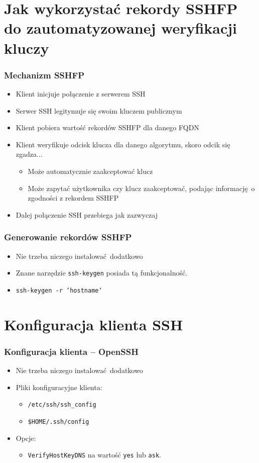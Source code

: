 \documentclass[dvipsnames,table]{beamer}
\begin{document}
\section{Jak wykorzystać rekordy SSHFP do zautomatyzowanej weryfikacji kluczy}

\begin{frame}
\frametitle{Mechanizm SSHFP}
\begin{itemize}
	\item Klient inicjuje połączenie z serwerem SSH
	\item Serwer SSH legitymuje się swoim kluczem publicznym
	\item Klient pobiera wartość rekordów SSHFP dla danego FQDN
	\item Klient weryfikuje odcisk klucza dla danego algorytmu, skoro odcik się zgadza...
	\begin{itemize}
		\item Może automatycznie zaakceptować klucz
		\item Może zapytać użytkownika czy klucz zaakceptować, podając informację o zgodności z rekordem SSHFP
	\end{itemize}
	\item Dalej połączenie SSH przebiega jak zazwyczaj
\end{itemize}
\end{frame}

\begin{frame}
\frametitle{Generowanie rekordów SSHFP}
\begin{itemize}
	\item Nie trzeba niczego instalować dodatkowo \Smiley
	\item Znane narzędzie {\tt ssh-keygen} posiada tą funkcjonalność.
	\item {\tt ssh-keygen -r `hostname`}
\end{itemize}
\end{frame}

\section{Konfiguracja klienta SSH}

\begin{frame}
\frametitle{Konfiguracja klienta -- OpenSSH}
\begin{itemize}
	\item Nie trzeba niczego instalować dodatkowo \Smiley
	\item Pliki konfiguracyjne klienta:
	\begin{itemize}
		\item {\tt /etc/ssh/ssh\_config}
		\item {\tt \$HOME/.ssh/config}
	\end{itemize}
	\item Opcje:
	\begin{itemize}
		\item {\tt VerifyHostKeyDNS} na wartość {\tt yes} lub {\tt ask}.
	\end{itemize}
\end{itemize}
\end{frame}
\end{document}
